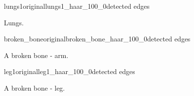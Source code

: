 \begin{figure}[h]
	\centering
	\begin{mainsubdiagrams2}{lungs1}{original}{lungs1_haar_100_0}{detected edges}
	\end{mainsubdiagrams2}
	
	\caption{Lungs.}
	\label{fig:lungs}
\end{figure}


\begin{figure}[h]
	\centering
	\begin{mainsubdiagrams2}{broken_bone}{original}{broken_bone_haar_100_0}{detected edges}
	\end{mainsubdiagrams2}
	
	\caption{A broken bone - arm.}
	\label{fig:arm}
\end{figure}

\begin{figure}[h]
	\centering
	\begin{mainsubdiagrams2}{leg1}{original}{leg1_haar_100_0}{detected edges}
	\end{mainsubdiagrams2}
	
	\caption{A broken bone - leg.}
	\label{fig:leg}
\end{figure}
